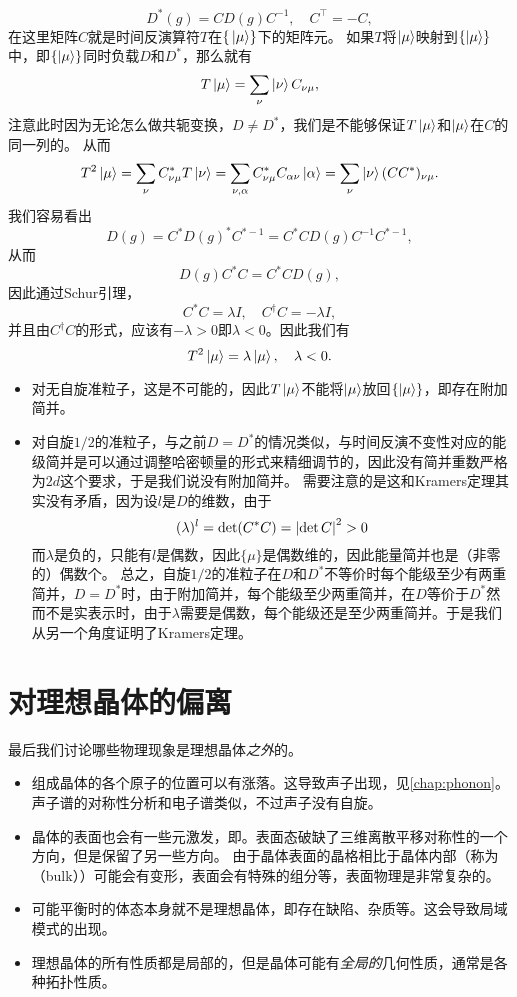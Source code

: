 \begin{itemize}
    \[
        D^*(g) = C D(g) C^{-1}, \quad C^\top = - C,
    \]
    在这里矩阵$C$就是时间反演算符$T$在$\{\ket*{\mu}\}$下的矩阵元。
    如果$T$将$\ket{\mu}$映射到$\{\ket{\mu}\}$中，即$\{\ket{\mu}\}$同时负载$D$和$D^*$，那么就有
    \[
        T \ket{\mu} = \sum_\nu \ket{\nu} C_{\nu \mu},
    \]
    注意此时因为无论怎么做共轭变换，$D \neq D^*$，我们是不能够保证$T \ket{\mu}$和$\ket{\mu}$在$C$的同一列的。
    从而
    \[
        T^2 \ket{\mu} = \sum_\nu C_{\nu \mu}^* T \ket{\nu} = \sum_{\nu, \alpha} C_{\nu \mu}^* C_{\alpha \nu} \ket{\alpha} = \sum_\nu \ket{\nu} (C C^*)_{\nu \mu}.
    \]
    我们容易看出
    \[
        D(g) = C^* D(g)^* C^{*-1} = C^* C D(g) C^{-1} C^{*-1},
    \]
    从而
    \[
        D(g) C^* C = C^* C D(g),
    \]
    因此通过Schur引理，
    \[
        C^* C = \lambda I, \quad C^\dagger C = - \lambda I,
    \]
    并且由$C^\dagger C$的形式，应该有$-\lambda > 0$即$\lambda < 0$。因此我们有
    \[
        T^2 \ket{\mu} = \lambda \ket{\mu}, \quad \lambda < 0.
    \]
    \begin{itemize}
        \item 对无自旋准粒子，这是不可能的，因此$T \ket{\mu}$不能将$\ket{\mu}$放回$\{\ket{\mu}\}$，即存在附加简并。
        \item 对自旋$1/2$的准粒子，与之前$D = D^*$的情况类似，与时间反演不变性对应的能级简并是可以通过调整哈密顿量的形式来精细调节的，因此没有简并重数严格为$2d$这个要求，于是我们说没有附加简并。
        需要注意的是这和Kramers定理其实没有矛盾，因为设$l$是$D$的维数，由于
        \[
            (\lambda)^l = \det(C^* C) = \abs{\det C}^2 > 0
        \]
        而$\lambda$是负的，只能有$l$是偶数，因此$\{\mu\}$是偶数维的，因此能量简并也是（非零的）偶数个。
        总之，自旋$1/2$的准粒子在$D$和$D^*$不等价时每个能级至少有两重简并，$D = D^*$时，由于附加简并，每个能级至少两重简并，在$D$等价于$D^*$然而不是实表示时，由于$\lambda$需要是偶数，每个能级还是至少两重简并。于是我们从另一个角度证明了Kramers定理。
    \end{itemize}
\end{itemize}

\section{对理想晶体的偏离}

最后我们讨论哪些物理现象是理想晶体\emph{之外}的。
\begin{itemize}
    \item 组成晶体的各个原子的位置可以有涨落。这导致声子出现，见\autoref{chap:phonon}。声子谱的对称性分析和电子谱类似，不过声子没有自旋。
    \item 晶体的表面也会有一些元激发，即。表面态破缺了三维离散平移对称性的一个方向，但是保留了另一些方向。
    由于晶体表面的晶格相比于晶体内部（称为（bulk））可能会有变形，表面会有特殊的组分等，表面物理是非常复杂的。
    \item 可能平衡时的体态本身就不是理想晶体，即存在缺陷、杂质等。这会导致局域模式的出现。
    \item 理想晶体的所有性质都是局部的，但是晶体可能有\emph{全局的}几何性质，通常是各种拓扑性质。
\end{itemize}